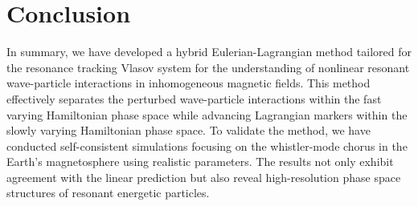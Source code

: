 \section{Conclusion}
\label{sec:end}
In summary, we have developed a hybrid Eulerian-Lagrangian method tailored for the resonance tracking Vlasov system
for the understanding of nonlinear resonant wave-particle interactions in inhomogeneous magnetic fields. This method effectively separates the perturbed wave-particle interactions within the fast varying Hamiltonian phase space while  advancing Lagrangian markers within the slowly varying Hamiltonian phase space. To validate the method, we have conducted self-consistent simulations focusing on the whistler-mode chorus in the Earth's magnetosphere  using realistic parameters. The results not only exhibit  agreement with the linear prediction  but also reveal high-resolution phase space structures of resonant energetic particles.
